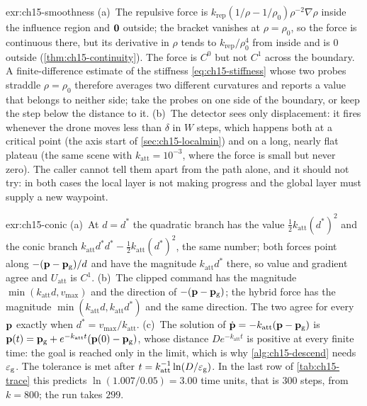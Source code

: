 \begin{solution}{exr:ch15-smoothness}
(a)~The repulsive force is $k_{\mathrm{rep}}(1/\rho-1/\rho_0)\rho^{-2}\nabla\rho$
inside the influence region and $\mathbf{0}$ outside; the bracket vanishes at
$\rho=\rho_0$, so the force is continuous there, but its derivative in $\rho$
tends to $k_{\mathrm{rep}}/\rho_0^4$ from inside and is $0$ outside
(\cref{thm:ch15-continuity}). The force is $C^0$ but not $C^1$ across the
boundary. A finite-difference estimate of the stiffness
\cref{eq:ch15-stiffness} whose two probes straddle $\rho=\rho_0$ therefore
averages two different curvatures and reports a value that belongs to neither
side; take the probes on one side of the boundary, or keep the step below the
distance to it.
(b)~The detector sees only displacement: it fires whenever the drone moves
less than $\delta$ in $W$ steps, which happens both at a critical point (the
axis start of \cref{sec:ch15-localmin}) and on a long, nearly flat plateau
(the same scene with $k_{\mathrm{att}}=10^{-3}$, where the force is small but
never zero). The caller cannot tell them apart from the path alone, and it
should not try: in both cases the local layer is not making progress and the
global layer must supply a new waypoint.
\end{solution}

\begin{solution}{exr:ch15-conic}
(a)~At $d=d^*$ the quadratic branch has the value $\tfrac12 k_{\mathrm{att}}(d^*)^2$
and the conic branch $k_{\mathrm{att}}d^*d^*-\tfrac12 k_{\mathrm{att}}(d^*)^2$, the
same number; both forces point along $-(\mathbf{p}-\mathbf{p}_{\mathrm{g}})/d$ and have the
magnitude $k_{\mathrm{att}}d^*$ there, so value and gradient agree and
$U_{\mathrm{att}}$ is $C^1$.
(b)~The clipped command has the magnitude $\min(k_{\mathrm{att}}d, v_{\max})$ and the
direction of $-(\mathbf{p}-\mathbf{p}_{\mathrm{g}})$; the hybrid force has the magnitude
$\min(k_{\mathrm{att}}d, k_{\mathrm{att}}d^*)$ and the same direction. The two agree
for every $\mathbf{p}$ exactly when $d^*=v_{\max}/k_{\mathrm{att}}$.
(c)~The solution of $\dot{\mathbf{p}}=-k_{\mathrm{att}}(\mathbf{p}-\mathbf{p}_{\mathrm{g}})$ is
$\mathbf{p}(t)=\mathbf{p}_{\mathrm{g}}+e^{-k_{\mathrm{att}}t}(\mathbf{p}(0)-\mathbf{p}_{\mathrm{g}})$, whose
distance $D e^{-k_{\mathrm{att}}t}$ is positive at every finite time: the goal is
reached only in the limit, which is why \cref{alg:ch15-descend} needs
$\varepsilon_{\mathrm{g}}$. The tolerance is met after
$t=k_{\mathrm{att}}^{-1}\ln(D/\varepsilon_{\mathrm{g}})$. In the last row of
\cref{tab:ch15-trace} this predicts $\ln(1.007/0.05)=3.00$ time units, that is
$300$ steps, from $k=800$; the run takes $299$.
\end{solution}

